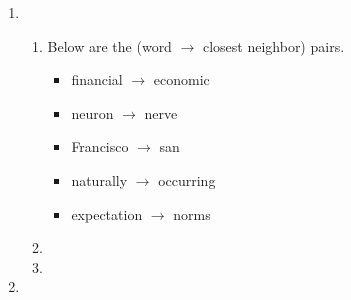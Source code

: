 \documentclass[12pt]{article}
\begin{document}
\begin{enumerate}[label=\textbf{\arabic*.}]
\begin{enumerate}[label=(\alph*)]
    \item
    \begin{enumerate}[label=\roman*.]
      \item Below are the (word $\rightarrow$ closest neighbor) pairs.
        \begin{itemize}
          \item financial $\rightarrow$ economic
          \item neuron $\rightarrow$ nerve
          \item Francisco $\rightarrow$ san
          \item naturally $\rightarrow$ occurring
          \item expectation $\rightarrow$ norms
        \end{itemize}
      \item
      \item
    \end{enumerate}
    \item
  \end{enumerate}
\end{enumerate}
\end{document}
